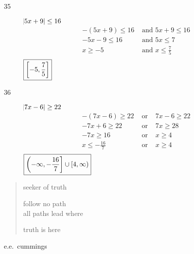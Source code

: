 \documentclass[letterpaper, landscape]{exam}
\begin{document}
\begin{description}
      \item[35]
        $ \abs{ 5x + 9 } \leq 16 $
        \begin{align*}
          -(5x + 9) \leq 16 & \text{ and } 5x + 9 \leq 16 \\
          -5x - 9 \leq 16   & \text{ and } 5x \leq 7 \\
          x \geq -5         & \text{ and } x \leq \frac{7}{5} \\
        \end{align*}
        $\boxed{ \intcc{ -5, \frac{7}{5} } }$

      \item[36]
        $\abs{ 7x - 6 } \geq 22$
        \begin{align*}
          -(7x - 6) \geq 22     & \text{ or } & 7x - 6 \geq 22 \\
          -7x + 6 \geq 22       & \text{ or } & 7x \geq 28 \\
          -7x \geq 16           & \text{ or } & x \geq 4 \\
          x \leq - \frac{16}{7} & \text{ or } & x \geq 4 \\
        \end{align*}
        $\boxed{ \intoc{ -\infty, -\frac{16}{7} } \cup \intco{ 4, \infty } }$

    \end{description}
  \fi

  \ifprintanswers{}
  \else
    \vspace{5 in}

    \begin{verse}
      seeker of truth

      follow no path \\
      all paths lead where

      truth is here 
    \end{verse}
    \hspace{1 in} e.e.\ cummings

  \fi
\end{document}
